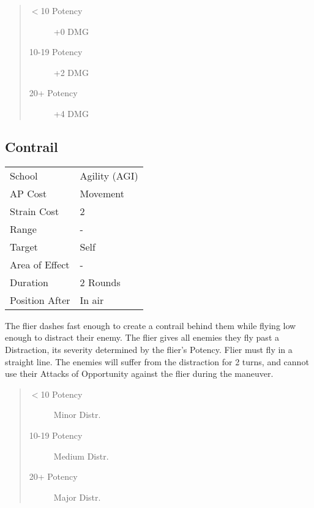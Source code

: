 \documentclass[11pt,a4paper,twocolumn]{book}
\begin{document}
\begin{quote}
	\begin{description}
		\item[$<$10 Potency] 	+0 DMG
		\item[10-19 Potency] 	+2 DMG
		\item[20+ Potency] 	+4 DMG
	\end{description}
\end{quote}


\vfill

\subsection*{Contrail}
{
	\begin{tabu} to 75mm{| X[l,4] | X[l,7] |}
		\hline
		School 			& Agility (AGI) 	\\
		AP Cost	      	& Movement 			\\
		Strain Cost     & 2 				\\
		Range     		& - 				\\
		Target      	& Self 				\\
		Area of Effect  & - 	 			\\
		Duration     	& 2 Rounds 	 		\\
		Position After  & In air 			\\ \hline
	\end{tabu}
	
}

\medskip

The flier dashes fast enough to create a contrail behind them while flying low enough to distract their enemy. The flier gives all enemies they fly past a Distraction, its severity determined by the flier's Potency. Flier must fly in a straight line. The enemies will suffer from the distraction for 2 turns, and cannot use their Attacks of Opportunity against the flier during the maneuver. 

\begin{quote}
	\begin{description}
		\item[$<$10 Potency] 	Minor Distr.
		\item[10-19 Potency] 	Medium Distr.
		\item[20+ Potency] 	Major Distr.
	\end{description}
\end{quote}
\end{document}
